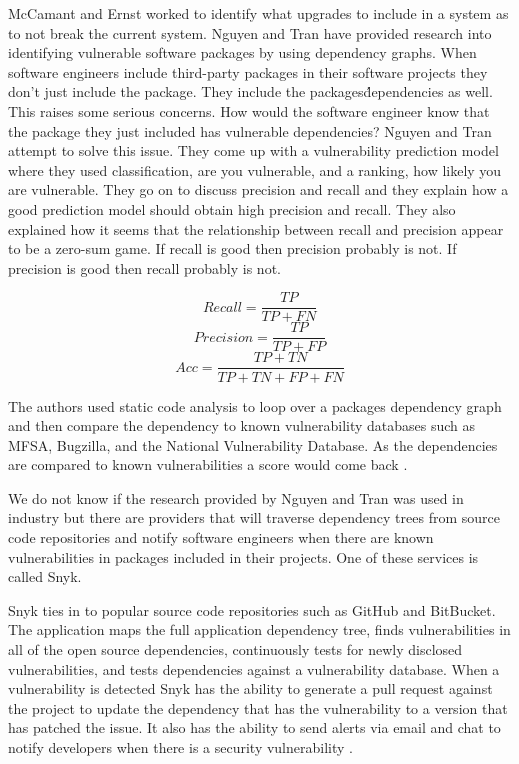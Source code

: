 \documentclass[journal]{IEEEtran}
\begin{document}
McCamant and Ernst worked to identify what upgrades to include in a system as to not break the current system. Nguyen and Tran have provided research into identifying vulnerable software packages by using dependency graphs. When software engineers include third-party packages in their software projects they don't just include the package. They include the packages\' dependencies as well. This raises some serious concerns. How would the software engineer know that the package they just included has vulnerable dependencies? Nguyen and Tran attempt to solve this issue. They come up with a vulnerability prediction model where they used classification, are you vulnerable, and a ranking, how likely you are vulnerable. They go on to discuss precision and recall and they explain how a good prediction model should obtain high precision and recall. They also explained how it seems that the relationship between recall and precision appear to be a zero-sum game. If recall is good then precision probably is not. If precision is good then recall probably is not. 

\[Recall = \frac{TP}{TP + FN}\]
\[Precision = \frac{TP}{TP + FP}\]
\[Acc = \frac{TP + TN}{TP + TN + FP + FN}\]

The authors used static code analysis to loop over a packages dependency graph and then compare the dependency to known vulnerability databases such as MFSA, Bugzilla, and the National Vulnerability Database. As the dependencies are compared to known vulnerabilities a score would come back \cite{Nguyen_Tran_2010}.

We do not know if the research provided by Nguyen and Tran was used in industry but there are providers that will traverse dependency trees from source code repositories and notify software engineers when there are known vulnerabilities in packages included in their projects. One of these services is called Snyk. 

Snyk ties in to popular source code repositories such as GitHub and BitBucket. The application maps the full application dependency tree, finds vulnerabilities in all of the open source dependencies, continuously tests for newly disclosed vulnerabilities, and tests dependencies against a vulnerability database. When a vulnerability is detected Snyk has the ability to generate a pull request against the project to update the dependency that has the vulnerability to a version that has patched the issue. It also has the ability to send alerts via email and chat to notify developers when there is a security vulnerability \cite{Continuously}. 
\end{document}
